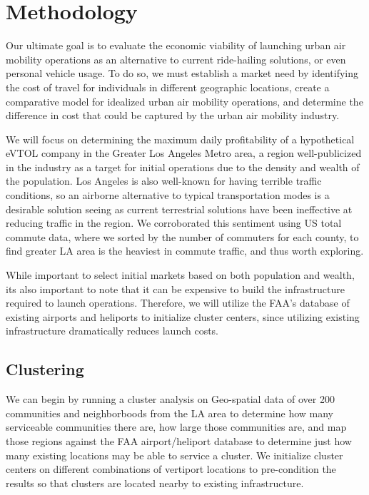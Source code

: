 \documentclass{article}
\begin{document}
\section{Methodology}
Our ultimate goal is to evaluate the economic viability of launching urban air mobility operations as an alternative to current ride-hailing solutions, or even personal vehicle usage. To do so, we must establish a market need by identifying the cost of travel for individuals in different geographic locations, create a comparative model for idealized urban air mobility operations, and determine the difference in cost that could be captured by the urban air mobility industry.

We will focus on determining the maximum daily profitability of a hypothetical eVTOL company in the Greater Los Angeles Metro area,  a region well-publicized in the industry as a target for initial operations due to the density and wealth of the population. Los Angeles is also well-known for having terrible traffic conditions, so an airborne alternative to typical transportation modes is a desirable solution seeing as current terrestrial solutions have been ineffective at reducing traffic in the region. We corroborated this sentiment using US total commute data, where we sorted by the number of commuters for each county, to find greater LA area is the heaviest in commute traffic, and thus worth exploring.

While important to select initial markets based on both population and wealth, its also important to note that it can be expensive to build the infrastructure required to launch operations. Therefore, we will utilize the FAA's database of existing airports and heliports to initialize cluster centers, since utilizing existing infrastructure dramatically reduces launch costs.

\subsection{Clustering}

We can begin by running a cluster analysis on Geo-spatial data of over 200 communities and neighborboods from the LA area to determine how many serviceable communities there are, how large those communities are, and map those regions against the FAA airport/heliport database to determine just how many existing locations may be able to service a cluster. We initialize cluster centers on different combinations of vertiport locations to pre-condition the results so that clusters are located nearby to existing infrastructure. 
\end{document}
